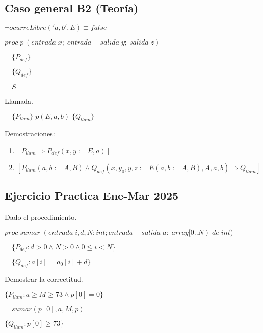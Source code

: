 \documentclass[hidelinks]{article}
\begin{document}
\subsection{Caso general B2 (Teoría)}

$\neg ocurreLibre('a,b', E) \equiv false$ \par
$proc \; p \; (entrada \; x; \; entrada-salida \; y; \; salida \; z) $ \par
$\quad \{P_{def}\}$ \par
$\quad \{Q_{def}\}$ \par
$\quad S$ \par

Llamada.\par

$\quad \{P_{llam}\} \; p(E,a,b) \; \{Q_{llam}\}$ \par

Demostraciones:
\begin{enumerate}
	\item $[P_{llam} \Rightarrow P_{def}(x,y := E,a)]$ \par
	\item $[P_{llam}(a,b := A,B) \land Q_{def}(x,y_0,y,z := E(a,b := A,B),A,a,b) \Rightarrow Q_{llam}]$ \par
\end{enumerate}

\newpage


\subsection{Ejercicio Practica Ene-Mar 2025}

Dado el procedimiento. \par
$proc \; sumar \; (entrada \; i,d,N:int; entrada-salida \; a: \; array[0..N) \; de \; int) $ \par
$\quad \{P_{def}: d>0 \land N>0 \land 0 \leq i < N\}$ \par
$\quad \{Q_{def}: a[i] = a_0[i] + d\}$ \par

Demostrar la correctitud. \par

$\{P_{llam}: a \geq M \geq 73 \land p[0]=0\}$ \par
$\quad sumar(p[0],a,M,p)$ \par
$\{Q_{llam}: p[0] \geq 73\}$ \par

\vspace{2em}
\end{document}
